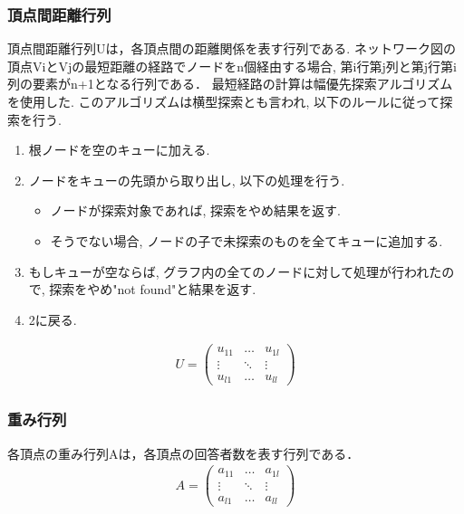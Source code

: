 \documentclass[syuuron]{kuee}
\begin{document}
			\subsubsection{頂点間距離行列}
				頂点間距離行列Uは，各頂点間の距離関係を表す行列である. 
				ネットワーク図の頂点ViとVjの最短距離の経路でノードをn個経由する場合, 
				第i行第j列と第j行第i列の要素がn+1となる行列である．
				最短経路の計算は幅優先探索アルゴリズムを使用した. 
				このアルゴリズムは横型探索とも言われ, 以下のルールに従って探索を行う. 
				
				\begin{enumerate}
					\item 根ノードを空のキューに加える. 
					\item ノードをキューの先頭から取り出し, 以下の処理を行う. 
						\begin{itemize}
							\item ノードが探索対象であれば, 探索をやめ結果を返す. 
							\item そうでない場合, ノードの子で未探索のものを全てキューに追加する. 
						\end{itemize}
					\item もしキューが空ならば, グラフ内の全てのノードに対して処理が行われたので, 探索をやめ"not found"と結果を返す. 
					\item 2に戻る. 
				\end{enumerate}
				
				\begin{eqnarray}
				 U = \left(
				    \begin{array}{cccc}
				    	u_{11} & \ldots & u_{1l} \\
				    	\vdots & \ddots & \vdots \\
				    	u_{l1} & \ldots & u_{ll}
					\end{array}
				 \right)
				\end{eqnarray}	
				
			\subsubsection{重み行列}
				各頂点の重み行列Aは，各頂点の回答者数を表す行列である．
				\begin{eqnarray}
				 A = \left(
				    \begin{array}{cccc}
				    	a_{11} & \ldots & a_{1l} \\
				    	\vdots & \ddots & \vdots \\
				    	a_{l1} & \ldots & a_{ll}
					\end{array}
				 \right)
				\end{eqnarray}	
				
\end{document}
